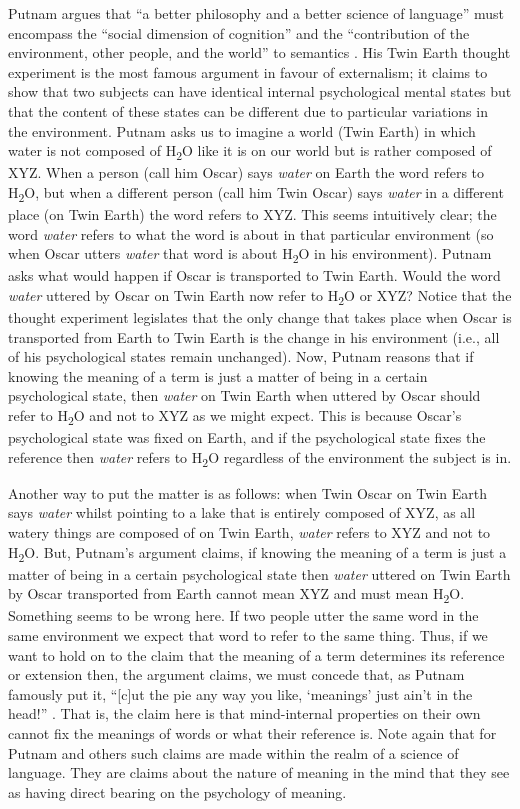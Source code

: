 Putnam argues that “a better philosophy and a better science of language” must encompass the “social dimension of cognition” and the “contribution of the environment, other people, and the world” to semantics \citep[193]{Putnam1975}. His Twin Earth thought experiment is the most famous argument in favour of externalism; it claims to show that two subjects can have identical internal psychological mental states but that the content of these states can be different due to particular variations in the environment. Putnam asks us to imagine a world (Twin Earth) in which water is not composed of H\textsubscript{2}O like it is on our world but is rather composed of XYZ. When a person (call him Oscar) says \textit{water} on Earth the word refers to H\textsubscript{2}O, but when a different person (call him Twin Oscar) says \textit{water} in a different place (on Twin Earth) the word refers to XYZ. This seems intuitively clear; the word \textit{water} refers to what the word is about in that particular environment (so when Oscar utters \textit{water} that word is about H\textsubscript{2}O in his environment). Putnam asks what would happen if Oscar is transported to Twin Earth. Would the word \textit{water} uttered by Oscar on Twin Earth now refer to H\textsubscript{2}O or XYZ? Notice that the thought experiment legislates that the only change that takes place when Oscar is transported from Earth to Twin Earth is the change in his environment (i.e., all of his psychological states remain unchanged). Now, Putnam reasons that if knowing the meaning of a term is just a matter of being in a certain psychological state, then \textit{water} on Twin Earth when uttered by Oscar should refer to H\textsubscript{2}O and not to XYZ as we might expect. This is because Oscar’s psychological state was fixed on Earth, and if the psychological state fixes the reference then \textit{water} refers to H\textsubscript{2}O regardless of the environment the subject is in. 

Another way to put the matter is as follows: when Twin Oscar on Twin Earth says \textit{water} whilst pointing to a lake that is entirely composed of XYZ, as all watery things are composed of on Twin Earth, \textit{water} refers to XYZ and not to H\textsubscript{2}O. But, Putnam’s argument claims, if knowing the meaning of a term is just a matter of being in a certain psychological state then \textit{water} uttered on Twin Earth by Oscar transported from Earth cannot mean XYZ and must mean H\textsubscript{2}O. Something seems to be wrong here. If two people utter the same word in the same environment we expect that word to refer to the same thing. Thus, if we want to hold on to the claim that the meaning of a term determines its reference or extension then, the argument claims, we must concede that, as Putnam famously put it, “[c]ut the pie any way you like, ‘meanings’ just ain’t in the head!” \citep[144]{Putnam1975}. That is, the claim here is that mind-internal properties on their own cannot fix the meanings of words or what their reference is. Note again that for Putnam and others such claims are made within the realm of a science of language. They are claims about the nature of meaning in the mind that they see as having direct bearing on the psychology of meaning.


